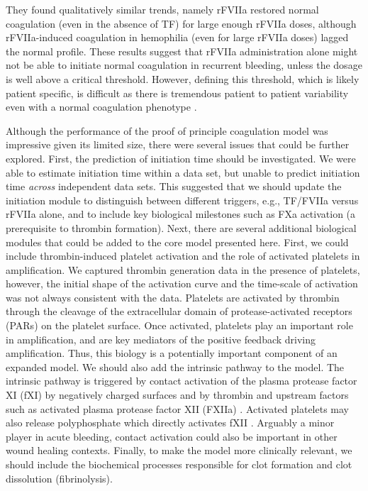 \documentclass[12pt]{article}
\begin{document}
They found qualitatively similar trends, namely rFVIIa restored normal coagulation (even in the absence of TF) for large enough rFVIIa doses, although rFVIIa-induced coagulation 
in hemophilia (even for large rFVIIa doses) lagged the normal profile. 
These results suggest that rFVIIa administration alone
might not be able to initiate normal coagulation in recurrent bleeding, unless the dosage is well above a critical threshold.
However, defining this threshold, which is likely patient specific, is difficult as there is tremendous patient to patient variability even with a normal
coagulation phenotype \citep{Danforth:2012aa}. 

Although the performance of the proof of principle coagulation model was impressive given its limited size, there were several issues that could be further explored.
First, the prediction of initiation time should be investigated. 
We were able to estimate initiation time within a data set, but unable to predict initiation time \textit{across} independent data sets. 
This suggested that we should update the initiation module to distinguish between different triggers, e.g., TF/FVIIa versus rFVIIa alone, 
and to include key biological milestones such as FXa activation (a prerequisite to thrombin formation).
Next, there are several additional biological modules that could be added to the core model presented here. 
First, we could include thrombin-induced platelet activation and the role of activated platelets in amplification.
We captured thrombin generation data in the presence of platelets, however,
the initial shape of the activation curve and the time-scale of activation was not always consistent with the data.
Platelets are activated by thrombin through the cleavage of the extracellular domain of protease-activated receptors (PARs) on the platelet surface.
Once activated, platelets play an important role in amplification, and are key mediators of the positive feedback driving amplification.
Thus, this biology is a potentially important component of an expanded model.
We should also add the intrinsic pathway to the model. 
The intrinsic pathway is triggered by contact activation of the plasma protease factor XI (fXI) by negatively charged surfaces and by thrombin and upstream factors such as activated
plasma protease factor XII (FXIIa) \citep{NAITO1991,Gailani:1991aa}.
Activated platelets may also release polyphosphate which directly activates fXII \cite{Smith:2006zl}. 
Arguably a minor player in acute bleeding, contact activation could also be important in other wound healing contexts. 
Finally, to make the model more clinically relevant, we should include the biochemical processes responsible for clot formation and clot dissolution (fibrinolysis).
\end{document}
